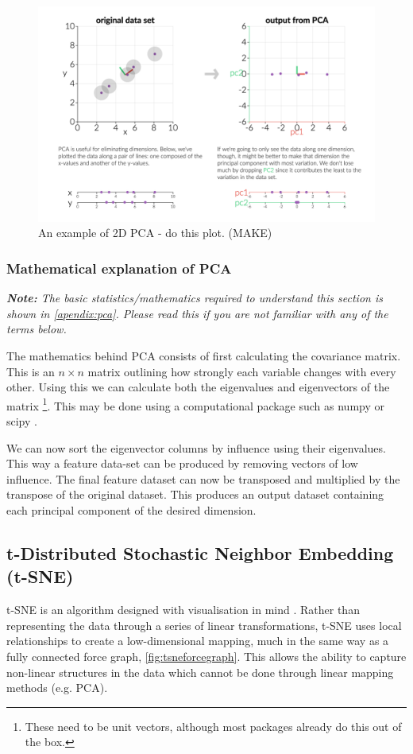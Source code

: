 \begin{figure}[h]
    \centering
    \includegraphics[width=.5\textwidth]{./4fig/pca2d.png}
    \caption{An example of 2D  PCA - do this plot. (MAKE)}
    \label{fig:2dpca}
\end{figure}


\subsubsection{Mathematical explanation of PCA}
\emph{\textbf{Note:} The basic statistics/mathematics required to understand this section is shown in \autoref{apendix:pca}. Please read this if you are not familiar with any of the terms below.
}

The mathematics behind PCA consists of first calculating the covariance matrix. This is an $n \times n$ matrix outlining how strongly each variable changes with every other. Using this we can calculate both the eigenvalues and eigenvectors of the matrix \footnote{These need to be unit vectors, although most packages already do this out of the box.}. This may be done using a computational package such as numpy or scipy \cite{numpy,scipy}.

We can now sort the eigenvector columns by influence using their eigenvalues. This way a feature data-set can be produced by removing vectors of low influence. The final feature dataset can now be transposed and multiplied by the transpose of the original dataset. This produces an output dataset containing each principal component of the desired dimension.



\subsection{t-Distributed Stochastic Neighbor Embedding (t-SNE)}

t-SNE is an algorithm designed with visualisation in mind \cite{tsne}. Rather than representing the data through a series of linear transformations, t-SNE uses local relationships to create a low-dimensional mapping, much in the same way as a fully connected force graph, \autoref{fig:tsneforcegraph}. This allows the ability to capture non-linear structures in the data which cannot be done through linear mapping methods (e.g. PCA).

